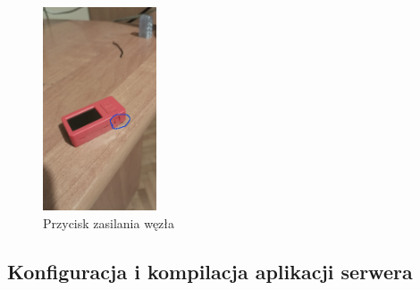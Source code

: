 \documentclass[12pt,oneside,a4paper]{book}
\theoremstyle{break}
\begin{document}
\begin{figure}[H]
    \begin{center}
        \includegraphics[width=0.3\textwidth]{m5-power.png}
        \caption{Przycisk zasilania węzła}
        \label{rys:m5-power}
    \end{center}
\end{figure}

\subsection{Konfiguracja i kompilacja aplikacji serwera} \label{compile-and-run-server-app}
\end{document}
